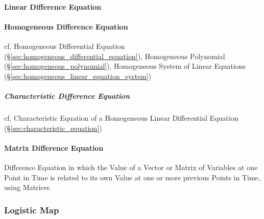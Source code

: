 \paragraph{Linear Difference Equation}\label{sec:linear_difference_equation}
\hfill

\paragraph{Homogeneous Difference Equation}
\label{sec:homogeneous_difference_equation}
\hfill

cf. Homogeneous Differential Equation
(\S\ref{sec:homogeneous_differential_equation}), Homogeneous Polynomial
(\S\ref{sec:homogeneous_polynomial}), Homogeneous System of Linear Equations
(\S\ref{sec:homogeneous_linear_equation_system})



\subparagraph{Characteristic Difference Equation}
\label{sec:characteristic_difference_equation}\hfill

cf. Characteristic Equation of a Homogeneous Linear Differential Equation
(\S\ref{sec:characteristic_equation})



\paragraph{Matrix Difference Equation}\label{sec:matrix_difference_equation}
\hfill

Difference Equation in which the Value of a Vector or Matrix of Variables at
one Point in Time is related to its own Value at one or more previous Points in
Time, using Matrices



\subsubsection{Logistic Map}\label{sec:logistic_map}

